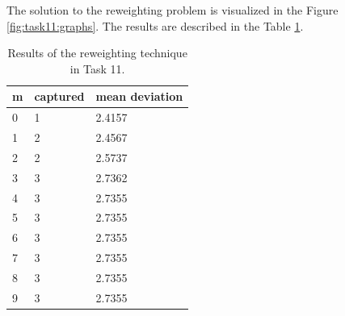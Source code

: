 The solution to the reweighting problem is visualized in the Figure \ref{fig:task11:graphs}. The results are described in the Table \ref{table:task11:results}.

\begin{table}[!htb]
\centering
\begin{tabular}{l|ll}
m & captured & mean deviation \\
\hline
0 & 1 & 2.4157 \\
1 & 2 & 2.4567 \\
2 & 2 & 2.5737 \\
3 & 3 & 2.7362 \\
4 & 3 & 2.7355 \\
5 & 3 & 2.7355 \\
6 & 3 & 2.7355 \\
7 & 3 & 2.7355 \\
8 & 3 & 2.7355 \\
9 & 3 & 2.7355
\end{tabular}
\caption{Results of the reweighting technique in Task 11.}
\label{table:task11:results}
\end{table}

